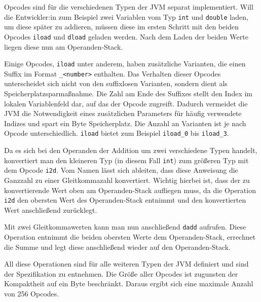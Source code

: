 Opcodes sind für die verschiedenen Typen der JVM separat implementiert. Will die Entwickler:in zum Beispiel zwei Variablen vom Typ \texttt{int} und \texttt{double} laden, um diese später zu addieren, müssen diese im ersten Schritt mit den beiden Opcodes \texttt{iload} und \texttt{dload} geladen werden. Nach dem Laden der beiden Werte liegen diese nun am Operanden-Stack.

Einige Opcodes, \texttt{iload} unter anderem, haben zusätzliche Varianten, die einen Suffix im Format \texttt{\_<number>} enthalten. Das Verhalten dieser Opcodes unterscheidet sich nicht von den suffixlosen Varianten, sondern dient als Speicherplatzsparmaßnahme. Die Zahl am Ende des Suffixes stellt den Index im lokalen Variablenfeld dar, auf das der Opcode zugreift. Dadurch vermeidet die JVM die Notwendigkeit eines zusätzlichen Parameters für häufig verwendete Indizes und spart ein Byte Speicherplatz.  Die Anzahl an Varianten ist je nach Opcode unterschiedlich. \texttt{iload} bietet zum Beispiel \texttt{iload\_0} bis \texttt{iload\_3}. 

Da es sich bei den Operanden der Addition um zwei verschiedene Typen handelt, konvertiert man den kleineren Typ (in diesem Fall \texttt{int}) zum größeren Typ mit dem Opcode \texttt{i2d}. Vom Namen lässt sich ableiten, dass diese Anweisung die Ganzzahl zu einer Gleitkommazahl konvertiert. Wichtig hierbei ist, dass der zu konvertierende Wert oben am Operanden-Stack aufliegen muss, da die Operation \texttt{i2d} den obersten Wert des Operanden-Stack entnimmt und den konvertierten Wert anschließend zurücklegt.

Mit zwei Gleitkommawerten kann man nun anschließend \texttt{dadd} aufrufen. Diese Operation entnimmt die beiden obersten Werte dem Operanden-Stack, errechnet die Summe und legt diese anschließend wieder auf den Operanden-Stack.

All diese Operationen sind für alle weiteren Typen der JVM definiert und sind der Spezifikation zu entnehmen. Die Größe aller Opcodes ist zugunsten der Kompaktheit auf ein Byte beschränkt. Daraus ergibt sich eine maximale Anzahl von 256 Opcodes.